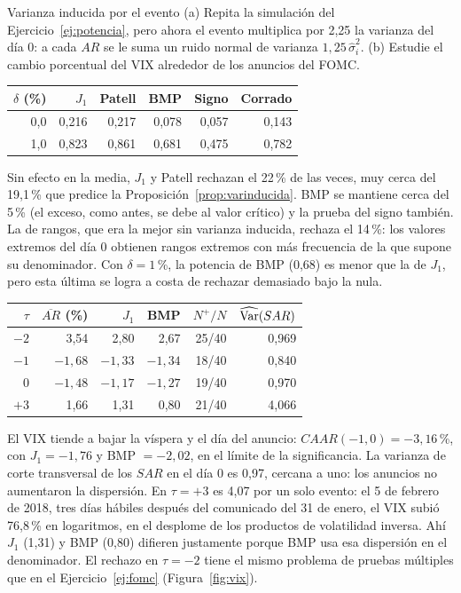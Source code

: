 \begin{ejresuelto}{Varianza inducida por el evento}\label{ej:varinducida}
\enunciado (a) Repita la simulación del Ejercicio~\ref{ej:potencia}, pero ahora el evento multiplica por 2,25 la varianza del
día 0: a cada $AR$ se le suma un ruido normal de varianza $1{,}25\,\hat\sigma_i^2$. (b) Estudie el cambio porcentual del VIX
alrededor de los anuncios del FOMC.

\solucion
{}
\begin{center}\small
\begin{tabular}{@{}rrrrrr@{}}
\toprule
$\delta$ (\%) & $J_1$ & Patell & BMP & Signo & Corrado \\
\midrule
0,0 & 0,216 & 0,217 & 0,078 & 0,057 & 0,143 \\
1,0 & 0,823 & 0,861 & 0,681 & 0,475 & 0,782 \\
\bottomrule
\end{tabular}
\end{center}
Sin efecto en la media, $J_1$ y Patell rechazan el 22\,\% de las veces, muy cerca del 19,1\,\% que predice la
Proposición~\ref{prop:varinducida}. BMP se mantiene cerca del 5\,\% (el exceso, como antes, se debe al valor crítico) y la prueba
del signo también. La de rangos, que era la mejor sin varianza inducida, rechaza el 14\,\%: los valores extremos del día 0
obtienen rangos extremos con más frecuencia de la que supone su denominador. Con $\delta=1$\,\%, la potencia de BMP (0,68) es
menor que la de $J_1$, pero esta última se logra a costa de rechazar demasiado bajo la nula.

\begin{center}\small
\begin{tabular}{@{}rrrrrr@{}}
\toprule
$\tau$ & $\overline{AR}$ (\%) & $J_1$ & BMP & $N^+/N$ & $\widehat{\operatorname{Var}}(SAR)$ \\
\midrule
$-2$ & 3,54 & 2,80 & 2,67 & 25/40 & 0,969 \\
$-1$ & $-1{,}68$ & $-1{,}33$ & $-1{,}34$ & 18/40 & 0,840 \\
0    & $-1{,}48$ & $-1{,}17$ & $-1{,}27$ & 19/40 & 0,970 \\
$+3$ & 1,66 & 1,31 & 0,80 & 21/40 & 4,066 \\
\bottomrule
\end{tabular}
\end{center}
El VIX tiende a bajar la víspera y el día del anuncio: $CAAR(-1,0)=-3{,}16$\,\%, con $J_1=-1{,}76$ y BMP $=-2{,}02$, en el límite de la
significancia. La varianza de corte transversal de los $SAR$ en el día 0 es 0,97, cercana a uno: los anuncios no aumentaron la
dispersión. En $\tau=+3$ es 4,07 por un solo evento: el 5 de febrero de 2018, tres días hábiles después del comunicado del 31
de enero, el VIX subió 76,8\,\% en logaritmos, en el desplome de los productos de volatilidad inversa. Ahí $J_1$ (1,31) y BMP (0,80)
difieren justamente porque BMP usa esa dispersión en el denominador. El rechazo en $\tau=-2$ tiene el mismo problema de
pruebas múltiples que en el Ejercicio~\ref{ej:fomc} (Figura~\ref{fig:vix}).


\end{ejresuelto}
